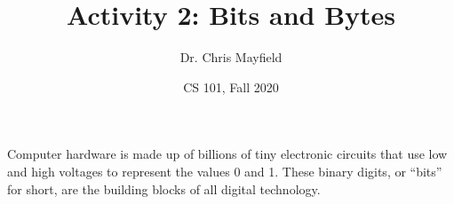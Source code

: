 \documentclass[12pt]{article}
\title{Activity 2: Bits and Bytes}
\author{Dr. Chris Mayfield}
\date{CS 101, Fall 2020}
\begin{document}
\maketitle

Computer hardware is made up of billions of tiny electronic circuits that use low and high voltages to represent the values 0 and 1.
These binary digits, or ``bits'' for short, are the building blocks of all digital technology.



\end{document}

